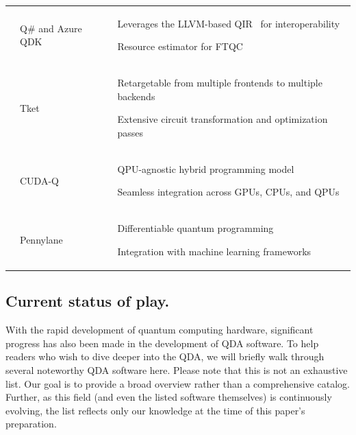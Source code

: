 \documentclass[a4paper,onecolumn,11pt,unpublished]{quantumarticle}
\begin{document}
\begin{table}[!ht]
\begin{tabular}{P{1.55cm}|P{2.6cm}|L{9.6cm}}
    & Q\# and Azure QDK~\cite{Svore_2018}
    & \begin{tightitemize}
        \item Leverages the LLVM-based QIR~\cite{QIRSpec2021} for interoperability
        \item Resource estimator for FTQC~\cite{damUsingAzureQuantum2024}
      \end{tightitemize} 
    \\ 
    
    & Tket~\cite{sivarajah2020t}
    & \begin{tightitemize}
        \item Retargetable from multiple frontends to multiple backends
        \item Extensive circuit transformation and optimization passes
      \end{tightitemize} 
    \\ 

    & CUDA-Q~\cite{CUDA-Q}
    & \begin{tightitemize}
        \item QPU-agnostic hybrid programming model
        \item Seamless integration across GPUs, CPUs, and QPUs
      \end{tightitemize} 
    \\ 
    
    & Pennylane~\cite{bergholmPennyLaneAutomaticDifferentiation2022}
    & \begin{tightitemize}
        \item Differentiable quantum programming
        \item Integration with machine learning frameworks
      \end{tightitemize}
    \\ \hline  
  \end{tabular}
\end{table}



\subsection{Current status of play.}
With the rapid development of quantum computing hardware, significant progress has also been made in the development of QDA software. To help readers who wish to dive deeper into the QDA, we will briefly walk through several noteworthy QDA software here. Please note that this is not an exhaustive list. Our goal is to provide a broad overview rather than a comprehensive catalog. Further, as this field (and even the listed software themselves) is continuously evolving, the list reflects only our knowledge at the time of this paper's preparation.
\end{document}
